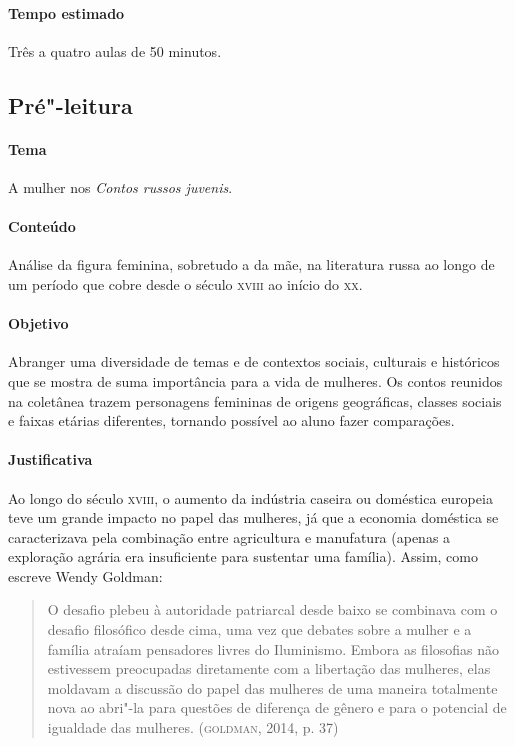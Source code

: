 \documentclass[11pt]{extarticle}
\begin{document}
\paragraph{Tempo estimado} Três a quatro aulas de 50 minutos.

\subsection{Pré"-leitura}

\paragraph{Tema} A mulher nos \emph{Contos russos juvenis}.


\paragraph{Conteúdo}
Análise da figura feminina, sobretudo a da mãe, na literatura russa ao
longo de um período que cobre desde o século \textsc{xviii} ao início do \textsc{xx}.

\paragraph{Objetivo}
Abranger uma diversidade de temas e de contextos sociais, culturais e
históricos que se mostra de suma importância para a vida de mulheres. Os
contos reunidos na coletânea trazem personagens femininas de origens
geográficas, classes sociais e faixas etárias diferentes, tornando
possível ao aluno fazer comparações.

\paragraph{Justificativa}
Ao longo do século \textsc{xviii}, o aumento da indústria caseira ou doméstica
europeia teve um grande impacto no papel das mulheres, já que a economia
doméstica se caracterizava pela combinação entre agricultura e
manufatura (apenas a exploração agrária era insuficiente para sustentar
uma família). Assim, como escreve Wendy Goldman:

\begin{quote}
O desafio plebeu à autoridade patriarcal desde baixo se combinava com o
desafio filosófico desde cima, uma vez que debates sobre a mulher e a
família atraíam pensadores livres do Iluminismo. Embora as filosofias
não estivessem preocupadas diretamente com a libertação das mulheres,
elas moldavam a discussão do papel das mulheres de uma maneira
totalmente nova ao abri"-la para questões de diferença de gênero e para o
potencial de igualdade das mulheres. (\textsc{goldman}, 2014, p. 37)
\end{quote}
\end{document}
